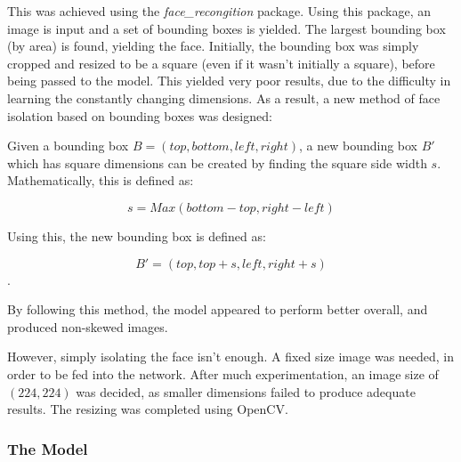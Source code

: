 \documentclass[11pt,a4paper]{article}
\begin{document}
                This was achieved using the \emph{face\_recongition} package. Using this package, an image is input and a set of bounding boxes is yielded. The largest bounding box (by area) is found,
                yielding the face. Initially, the bounding box was simply cropped and resized to be a square (even if it wasn't initially a square), before being passed to the model. This yielded very poor results,
                due to the difficulty in learning the constantly changing dimensions. As a result, a new method of face isolation based on bounding boxes was designed:

                Given a bounding box $B = (top, bottom, left, right)$, a new bounding box $B'$ which has square dimensions can be created by finding the square
                side width $s$. Mathematically, this is defined as:

                $$s = Max(bottom - top, right - left)$$

                Using this, the new bounding box is defined as:

                $$B' = (top, top + s, left, right + s)$$.

                By following this method, the model appeared to perform better overall, and produced non-skewed images.

                However, simply isolating the face isn't enough. A fixed size image was needed, in order to be fed into the network. After much experimentation, an image size of $(224, 224)$
                was decided, as smaller dimensions failed to produce adequate results. The resizing was completed using OpenCV.

                
            \subsubsection{The Model}
                    
\end{document}
